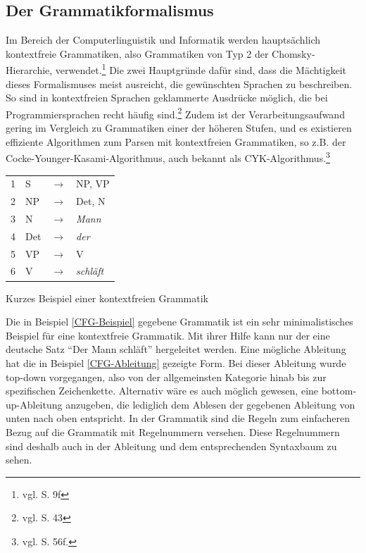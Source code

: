 \subsection{Der Grammatikformalismus}
\label{subsec:grammatik}
Im Bereich der Computerlinguistik und Informatik werden hauptsächlich kontextfreie Grammatiken, also Grammatiken von Typ 2 der Chomsky-Hierarchie, verwendet.\footnote{vgl. \cite{SCHOENING2008} S. 9f} Die zwei Hauptgründe dafür sind, dass die Mächtigkeit dieses Formalismuses meist ausreicht, die gewünschten Sprachen zu beschreiben. So sind in kontextfreien Sprachen geklammerte Ausdrücke möglich, die bei Programmiersprachen recht häufig sind.\footnote{vgl. \cite{SCHOENING2008} S. 43} Zudem ist der Verarbeitungsaufwand gering im Vergleich zu Grammatiken einer der höheren Stufen, und es existieren effiziente Algorithmen zum Parsen mit kontextfreien Grammatiken, so z.B. der Cocke-Younger-Kasami-Algorithmus, auch bekannt als CYK-Algorithmus.\footnote{vgl. \cite{SCHOENING2008} S. 56f.}
\begin{program}[h!tp]
\begin{tabular}{llll}
1 & S & $\longrightarrow$ & NP, VP \\
2 & NP & $\longrightarrow$ & Det, N \\
3 & N & $\longrightarrow$ & \textit{Mann} \\
4 & Det & $\longrightarrow$ & \textit{der} \\
5 & VP & $\longrightarrow$ & V \\
6 & V  & $\longrightarrow$ & \textit{schläft} \\
\end{tabular}
\caption{Kurzes Beispiel einer kontextfreien Grammatik}
\label{CFG-Beispiel}
\end{program}
Die in Beispiel \ref{CFG-Beispiel} gegebene Grammatik ist ein sehr minimalistisches Beispiel für eine kontextfreie Grammatik. Mit ihrer Hilfe kann nur der eine deutsche Satz "`Der Mann schläft"' hergeleitet werden. Eine mögliche Ableitung hat die in Beispiel \ref{CFG-Ableitung} gezeigte Form. Bei dieser Ableitung wurde top-down vorgegangen, also von der allgemeinsten Kategorie hinab bis zur spezifischen Zeichenkette. Alternativ wäre es auch möglich gewesen, eine bottom-up-Ableitung anzugeben, die lediglich dem Ablesen der gegebenen Ableitung von unten nach oben entspricht. In der Grammatik sind die Regeln zum einfacheren Bezug auf die Grammatik mit Regelnummern versehen. Diese Regelnummern sind deshalb auch in der Ableitung und dem entsprechenden Syntaxbaum zu sehen. \par
